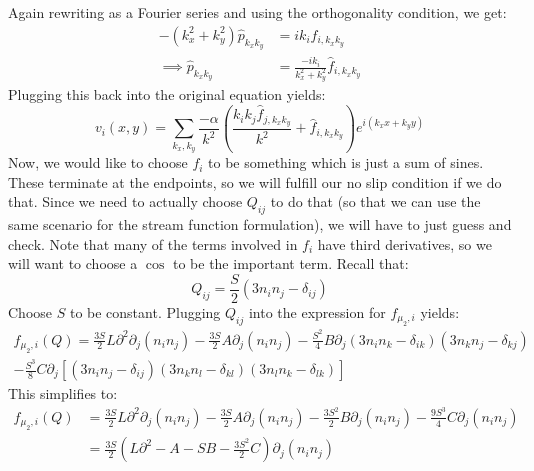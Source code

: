\documentclass[reqno]{article}
\begin{document}
	Again rewriting as a Fourier series and using the orthogonality condition, we get:
	\begin{equation} \label{eq:p-fourier-components}
	\begin{split}
		-\left( k_x^2 + k_y^2 \right) \hat{p}_{k_x k_y}
		&= i k_i \hat{f}_{i, k_x k_y} \\
		\implies \hat{p}_{k_x k_y}
		&= \frac{ -i k_i }{ k_x^2 + k_y^2 } \hat{f}_{i, k_x k_y}
	\end{split}
	\end{equation}
	Plugging this back into the original equation yields:
	\begin{equation} \label{eq:velocity-fourier-solution}
		v_i(x, y) 
		= \sum_{k_x, k_y} \frac{ -\alpha }{ k^2 } \left(
		\frac{ k_i k_j \hat{f}_{j, k_x k_y} }{k^2}
		+ \hat{f}_{i, k_x k_y}
		\right)
		e^{ i \left( k_x x + k_y y \right) }
	\end{equation}
	Now, we would like to choose $f_i$ to be something which is just a sum of sines.
	These terminate at the endpoints, so we will fulfill our no slip condition if we do that.
	Since we need to actually choose $Q_{ij}$ to do that (so that we can use the same scenario for the stream function formulation), we will have to just guess and check.
	Note that many of the terms involved in $f_i$ have third derivatives, so we will want to choose a $\cos$ to be the important term. 
	Recall that:
	\begin{equation}
		Q_{ij} 
		= \frac{S}{2} \left( 3 n_i n_j - \delta_{ij} \right)
	\end{equation}
	Choose $S$ to be constant. 
	Plugging $Q_{ij}$ into the expression for $f_{\mu_2, i}$ yields:
	\begin{multline}
		f_{\mu_2, i} (Q)
		= \frac{3 S}{2} L \partial^2 \partial_j \left( n_i n_j \right)
		- \frac{3 S}{2} A \partial_j \left( n_i n_j \right)
		- \frac{S^2}{4} B \partial_j 
		\left( 3 n_i n_k - \delta_{ik} \right)
		\left( 3 n_k n_j - \delta_{kj} \right)\\
		- \frac{S^3}{8} C \partial_j
		\left[
		\left( 3 n_i n_j - \delta_{ij} \right)
		\left( 3 n_k n_l - \delta_{kl} \right)
		\left( 3 n_l n_k - \delta_{lk} \right)
		\right]
	\end{multline}
	This simplifies to:
	\begin{equation}
	\begin{split}
		f_{\mu_2, i} (Q)
		&= \frac{3 S}{2} L \partial^2 \partial_j \left( n_i n_j \right)
		- \frac{3 S}{2} A \partial_j \left( n_i n_j \right)
		- \frac{3 S^2}{2} B \partial_j \left( n_i n_j \right)
		- \frac{9 S^3}{4} C \partial_j
		\left( n_i n_j \right) \\
		&= \frac{3 S}{2} 
		\left(
		L \partial^2 - A - S B - \frac{3 S^2}{2} C
		\right)
		\partial_j \left( n_i n_j \right)
	\end{split}
	\end{equation}
\end{document}
